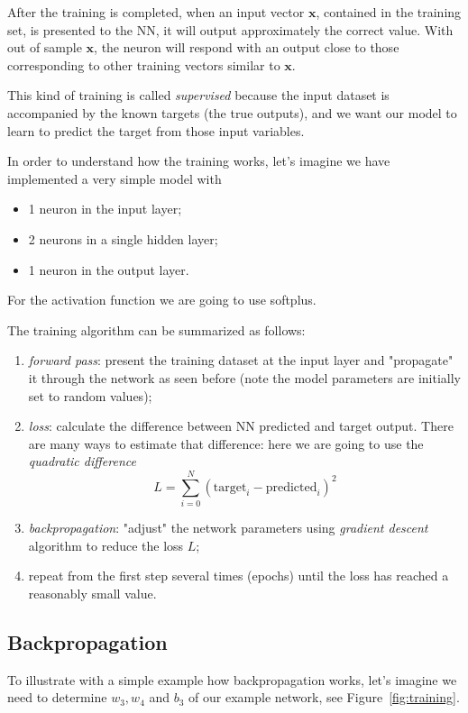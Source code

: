 After the training is completed, when an input vector $\mathbf{x}$, contained in the training set, is presented to the NN, it will output approximately the correct value. With out of sample $\mathbf{x}$, the neuron will respond with an output close to those corresponding to other training vectors similar to $\mathbf{x}$.

This kind of training is called \emph{supervised} because the input dataset is accompanied by the known targets (the true outputs), and we want our model to learn to predict the target from those input variables.

In order to understand how the training works, let's imagine we have implemented a very simple model with
\begin{itemize}
\item 1 neuron in the input layer;
\item 2 neurons in a single hidden layer;
\item 1 neuron in the output layer.
\end{itemize}
For the activation function we are going to use softplus.

The training algorithm can be summarized as follows:
\begin{enumerate}
\item \textit{forward pass}: present the training dataset at the input layer and "propagate" it through the network as seen before (note the model parameters are initially set to random values);
\item \textit{loss}: calculate the difference between NN predicted and target output. There are many ways to estimate that difference: here we are going to use the \textit{quadratic difference}
\begin{equation}
L = \sum_{i=0}^N (\text{target}_i - \text{predicted}_i)^2
\end{equation}
\item \textit{backpropagation}: "adjust" the network parameters using \textit{gradient descent} algorithm to reduce the loss $L$;
\item repeat from the first step several times (epochs) until the loss has reached a reasonably small value.
\end{enumerate}

\subsection{Backpropagation}

To illustrate with a simple example how backpropagation works, let's imagine we need to determine $w_3, w_4$ and $b_3$ of our example network, see Figure~\ref{fig:training}.

